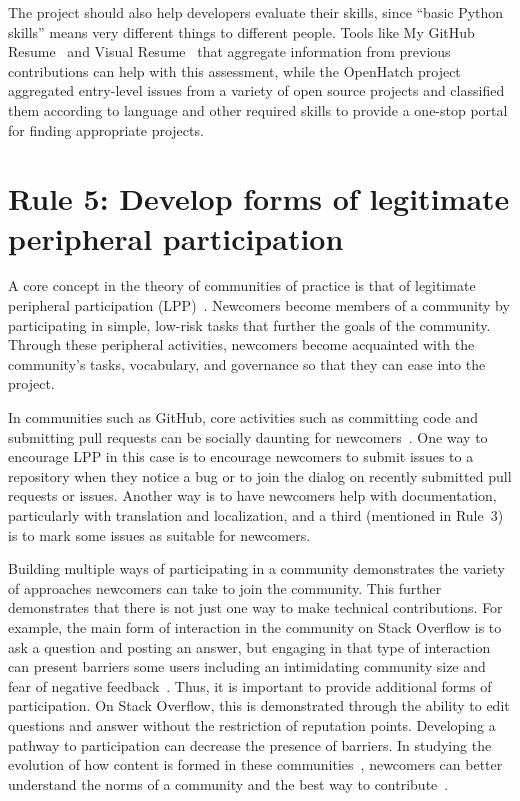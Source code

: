 \documentclass[10pt,letterpaper]{article}
\newcommand{\rulemajor}[1]{\section*{#1}}
\begin{document}
The project should also help developers evaluate their skills,
since ``basic Python skills'' means very different things to different people.
Tools like My GitHub Resume~\cite{my-github-resume} and Visual Resume~\cite{sarma2016}
that aggregate information from previous contributions can help with this assessment,
while the OpenHatch project~\cite{openhatch} aggregated entry-level issues from a variety of open source projects
and classified them according to language and other required skills
to provide a one-stop portal for finding appropriate projects.

\rulemajor{Rule 5: Develop forms of legitimate peripheral participation}

A core concept in the theory of communities of practice is that of
legitimate peripheral participation (LPP)~\cite{lave1991,wenger1999}.
Newcomers become members of a community by participating in simple, low-risk tasks
that further the goals of the community.
Through these peripheral activities,
newcomers become acquainted with the community's tasks, vocabulary, and governance
so that they can ease into the project.

In communities such as GitHub,
core activities such as committing code and submitting pull requests can be socially daunting for newcomers~\cite{steinmacher2015}.
One way to encourage LPP in this case is to encourage newcomers to submit issues to a repository when they notice a bug
or to join the dialog on recently submitted pull requests or issues.
Another way is to have newcomers help with documentation,
particularly with translation and localization,
and a third (mentioned in Rule~3) is to mark some issues as suitable for newcomers.

Building multiple ways of participating in a community demonstrates the variety of approaches newcomers can take to join the community.
This further demonstrates that there is not just one way to make technical contributions.
For example,
the main form of interaction in the community on Stack Overflow is to ask a question and posting an answer,
but engaging in that type of interaction can present barriers some users
including an intimidating community size and fear of negative feedback~\cite{ford2016}.
Thus, it is important to provide additional forms of participation.
On Stack Overflow, this is demonstrated through the ability to edit questions and answer without the restriction of reputation points.
Developing a pathway to participation can decrease the presence of barriers.
In studying the evolution of how content is formed in these communities~\cite{baltes2018},
newcomers can better understand the norms of a community and the best way to contribute~\cite{ford2018}.
\end{document}
